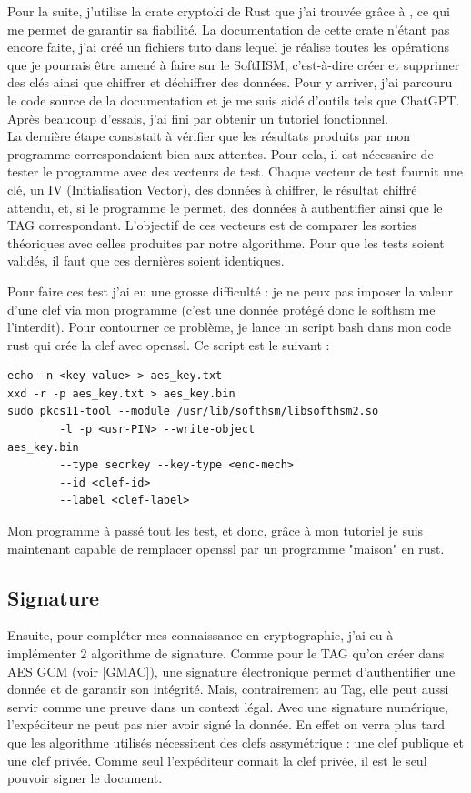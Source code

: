 \documentclass[a4paper, 12pt]{article}
\begin{document}
Pour la suite, j'utilise la crate cryptoki de Rust que j'ai trouvée grâce à \cite{bddrustcrypto}, ce qui me permet de garantir sa fiabilité.
La documentation de cette crate n'étant pas encore faite, j'ai créé un fichiers tuto dans lequel je réalise toutes les opérations que je pourrais être amené à faire sur le SoftHSM, c'est-à-dire créer et supprimer des clés ainsi que chiffrer et déchiffrer des données. Pour y arriver, j'ai parcouru le code source de la documentation et je me suis aidé d'outils tels que ChatGPT. Après beaucoup d'essais, j'ai fini par obtenir un tutoriel fonctionnel.\\

La dernière étape consistait à vérifier que les résultats produits par mon programme correspondaient bien aux attentes. Pour cela, il est nécessaire de tester le programme avec des vecteurs de test. Chaque vecteur de test fournit une clé, un IV (Initialisation Vector), des données à chiffrer, le résultat chiffré attendu, et, si le programme le permet, des données à authentifier ainsi que le TAG correspondant. L'objectif de ces vecteurs est de comparer les sorties théoriques avec celles produites par notre algorithme. Pour que les tests soient validés, il faut que ces dernières soient identiques.

Pour faire ces test j'ai eu une grosse difficulté : je ne peux pas imposer la valeur d'une clef via mon programme (c'est une donnée protégé donc le softhsm me l'interdit). Pour contourner ce problème, je lance un script bash dans mon code rust qui crée la clef avec openssl. Ce script est le suivant : 
\begin{verbatim}
echo -n <key-value> > aes_key.txt
xxd -r -p aes_key.txt > aes_key.bin
sudo pkcs11-tool --module /usr/lib/softhsm/libsofthsm2.so 
		-l -p <usr-PIN> --write-object
aes_key.bin 
		--type secrkey --key-type <enc-mech> 
		--id <clef-id> 
		--label <clef-label>
\end{verbatim}
Mon programme à passé tout les test, et donc, grâce à mon tutoriel je suis maintenant capable de remplacer openssl par un programme "maison" en rust.
\subsection{Signature}
Ensuite, pour compléter mes connaissance en cryptographie, j'ai eu à implémenter 2 algorithme de signature. Comme pour le TAG qu'on créer dans AES GCM (voir \ref{GMAC}), une signature électronique permet d'authentifier une donnée et de garantir son intégrité. Mais, contrairement au Tag, elle peut aussi servir comme une preuve dans un context légal. Avec une signature numérique, l'expéditeur ne peut pas nier avoir signé la donnée. En effet on verra plus tard que les algorithme utilisés nécessitent des clefs assymétrique : une clef publique et une clef privée. Comme seul l'expéditeur connait la clef privée, il est le seul  pouvoir signer le document.
\end{document}
